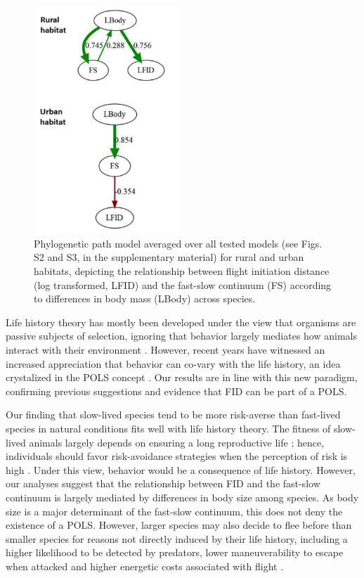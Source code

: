 \begin{figure}
\centering
\includegraphics[width=0.5\textwidth]{./Figures/chapter04/Fig_5.png}
\caption[Phylogenetic path models for rural and urban habitats]{
Phylogenetic path model averaged over all tested models (see
Figs. S2 and S3, in the supplementary material) for rural and urban habitats,
depicting the relationship between flight initiation distance (log transformed,
LFID) and the fast-slow continuum (FS) according to differences in body mass
(LBody) across species.}\label{fig:fig4.5}
\end{figure}


Life history theory has mostly been developed under the view
that organisms are passive subjects of selection, ignoring that
behavior largely mediates how animals interact with their environment 
\citep{Sol2016}. However, recent years
have witnessed an increased appreciation that behavior can
co-vary with the life history, an idea crystalized in the POLS
concept \citep{Ricklefs2002, Reale2010a}. Our
results are in line with this new paradigm, confirming previous
suggestions and evidence that FID can be part of a POLS.

Our finding that slow-lived species tend to be more risk-averse
than fast-lived species in natural conditions fits well
with life history theory. The fitness of slow-lived animals
largely depends on ensuring a long reproductive life \citep{Stearns2000}; 
hence, individuals should favor risk-avoidance strategies
when the perception of risk is high \citep{Martin2000, Wolf2007, Hau2010a, Moller2012, Moller2013a}. 
Under this view, behavior would be a
consequence of life history. However, our analyses suggest that
the relationship between FID and the fast-slow continuum is
largely mediated by differences in body size among species.
As body size is a major determinant of the fast-slow continuum,
this does not deny the existence of a POLS. However,
larger species may also decide to flee before than smaller species
for reasons not directly induced by their life history, including
a higher likelihood to be detected by predators, lower
maneuverability to escape when attacked and higher energetic
costs associated with flight \citep{Blumstein2006}.

